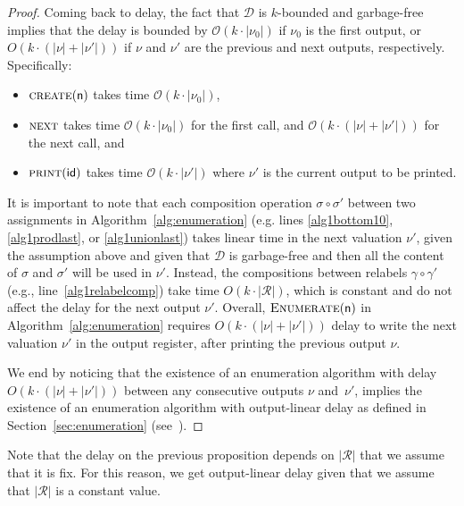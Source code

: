 \documentclass[
a4paper
]{article}
\theoremstyle{plain}
\theoremstyle{definition}
\theoremstyle{remark}
\newcommand{\Reg}{\mathcal{R}}
\newcommand{\D}{\mathcal{D}}
\newcommand{\n}{\textsf{n}}
\newcommand{\uid}{\operatorname{id}}
\newcommand{\cO}{\mathcal{O}}
\renewcommand{\operatorname}[1]{\textsf{#1}}
\begin{document}
\begin{proof}
	Coming back to delay, the fact that $\D$ is $k$-bounded and garbage-free implies that the delay is bounded by $\cO(k\cdot |\nu_0|)$ if $\nu_0$ is the first output, or $O(k\cdot (|\nu| + |\nu'|))$ if $\nu$ and $\nu'$ are the previous and next outputs, respectively. Specifically:
	\begin{itemize}
		\item $\textsc{create}(\n)$ takes time $\cO(k\cdot |\nu_0|)$,
		\item $\textsc{next}$ takes time $\cO(k\cdot |\nu_0|)$ for the first call, and $\cO(k\cdot (|\nu|+|\nu'|))$ for the next call, and
		\item $\textsc{print}(\uid)$ takes time $\cO(k\cdot |\nu'|)$ where $\nu'$ is the current output to be printed.  
	\end{itemize}
	It is important to note that each composition operation $\sigma \circ \sigma'$ between two assignments in Algorithm~\ref{alg:enumeration} (e.g. lines \ref{alg1bottom10}, \ref{alg1prodlast}, or \ref{alg1unionlast}) takes linear time in the next valuation $\nu'$, given the assumption above and given that $\D$ is garbage-free and then all the content of $\sigma$ and $\sigma'$ will be used in $\nu'$. Instead, the compositions between relabels $\gamma \circ \gamma'$ (e.g., line~\ref{alg1relabelcomp}) take time $O(k\cdot |\Reg|)$, which is constant and do not affect the delay for the next output $\nu'$. 
	Overall, $\textsc{Enumerate}(\n)$ in Algorithm~\ref{alg:enumeration} requires $O(k\cdot (|\nu| + |\nu'|))$ delay to write the next valuation $\nu'$ in the output register, after printing the previous output $\nu$. 
	
	We end by noticing that the existence of an enumeration algorithm with delay $O(k\cdot (|\nu| + |\nu'|))$ between any consecutive outputs $\nu$ and~$\nu'$, implies the existence of an enumeration algorithm with output-linear delay as defined in Section~\ref{sec:enumeration} (see~\cite{MunozR22,MunozR23}).
\end{proof}

Note that the delay on the previous proposition depends on $|\Reg|$ that we assume that it is fix. For this reason, we get output-linear delay given that we assume that $|\Reg|$ is a constant value. 
\end{document}
